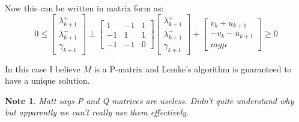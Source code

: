 \documentclass{article}
\newtheorem{note}{Note}
\begin{document}
Now this can be written in matrix form as:
\[
    0 \leq 
    \begin{bmatrix}
        \lambda^+_{k+1} \\
        \lambda^-_{k+1} \\
        \gamma_{k+1}
    \end{bmatrix}
    \perp
    \begin{bmatrix}
        1 & -1 & 1 \\
        -1 & 1 & 1 \\
        -1 & -1 & 0
    \end{bmatrix}
    \begin{bmatrix}
        \lambda^+_{k+1} \\
        \lambda^-_{k+1} \\
        \gamma_{k+1}
    \end{bmatrix}
    +
    \begin{bmatrix}
        v_k + u_{k+1} \\
        -v_k - u_{k+1} \\
        m g \mu
    \end{bmatrix}
    \geq 0
\]

In this case I believe $M$ is a P-matrix and Lemke's algorithm is guaranteed to have a unique solution.

\begin{note}
    Matt says P and Q matrices are useless. Didn't quite understand why but apparently we can't really use them effectively.
\end{note}
\end{document}
